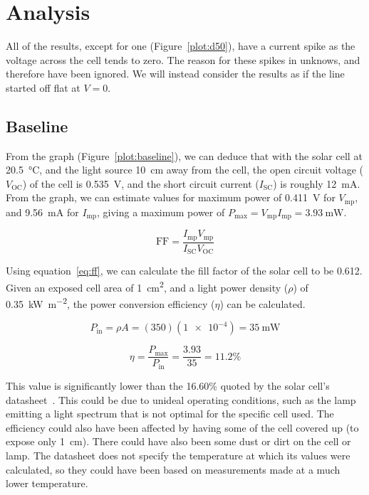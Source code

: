 \documentclass[a4paper,11pt]{article}
\begin{document}
\section{Analysis}

All of the results, except for one (Figure~\ref{plot:d50}), have a current spike as the voltage across the cell tends to zero. The reason for these spikes in unknows, and therefore have been ignored. We will instead consider the results as if the line started off flat at $V = 0$.

\subsection{Baseline}

From the graph (Figure~\ref{plot:baseline}), we can deduce that with the solar cell at \SI{20.5}{\celsius}, and the light source \SI{10}{\centi\metre} away from the cell, the open circuit voltage ($V_{\textrm{OC}}$) of the cell is \SI{0.535}{\volt}, and the short circuit current ($I_{\textrm{SC}}$) is roughly \SI{12}{\milli\ampere}. From the graph, we can estimate values for maximum power of \SI{0.411}{\volt} for $V_{\textrm{mp}}$, and \SI{9.56}{\milli\ampere} for $I_{\textrm{mp}}$, giving a maximum power of $P_{\textrm{max}} = V_{\textrm{mp}} I_{\textrm{mp}} = \SI{3.93}{\milli\watt}$.

\begin{equation} \label{eq:ff}
\textrm{FF} = \frac{I_{\textrm{mp}} V_{\textrm{mp}}}{I_{\textrm{SC}} V_{\textrm{OC}}}
\end{equation}

Using equation~\ref{eq:ff}, we can calculate the fill factor of the solar cell to be 0.612. Given an exposed cell area of \SI{1}{\centi\metre\squared}, and a light power density ($\rho$) of \SI{0.35}{\kilo\watt\per\metre\squared}, the power conversion efficiency ($\eta$) can be calculated.

\begin{displaymath}
P_{\textrm{in}} = \rho A
                = (350)(\num{1e-4})
                = \SI{35}{\milli\watt}
\end{displaymath}

\begin{displaymath}
\eta = \frac{P_{\textrm{max}}}{P_{\textrm{in}}}
     = \frac{3.93}{35}
     = 11.2\%
\end{displaymath}

This value is significantly lower than the 16.60\% quoted by the solar cell's datasheet~\cite[Appendix~B]{labNotes}. This could be due to unideal operating conditions, such as the lamp emitting a light spectrum that is not optimal for the specific cell used. The efficiency could also have been affected by having some of the cell covered up (to expose only \SI{1}{\centi\metre}). There could have also been some dust or dirt on the cell or lamp. The datasheet does not specify the temperature at which its values were calculated, so they could have been based on measurements made at a much lower temperature.
\end{document}
